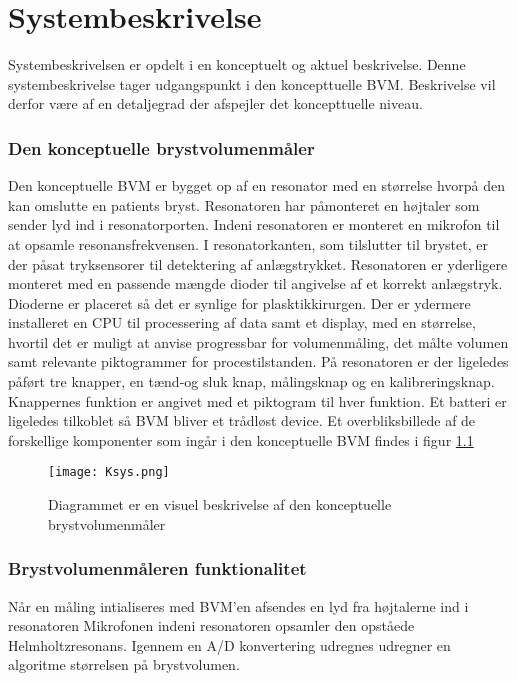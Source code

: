 \chapter{Systembeskrivelse}

Systembeskrivelsen er opdelt i en konceptuelt og aktuel beskrivelse.
Denne systembeskrivelse tager udgangspunkt i den koncepttuelle BVM. Beskrivelse vil derfor være af en detaljegrad der afspejler det koncepttuelle niveau.

		\subsection{Den konceptuelle brystvolumenmåler} \label{subsec:BVMopb}
		
		Den konceptuelle BVM er bygget op af en resonator med en størrelse hvorpå den kan omslutte en patients bryst. Resonatoren har påmonteret en højtaler som sender lyd ind i resonatorporten. Indeni resonatoren er monteret en mikrofon til at opsamle resonansfrekvensen. I resonatorkanten, som tilslutter til brystet, er der påsat tryksensorer til detektering af anlægstrykket. Resonatoren er yderligere monteret med en passende mængde dioder til angivelse af et korrekt anlægstryk. Dioderne er placeret så det er synlige for plasktikkirurgen. Der er ydermere installeret en CPU til processering af data samt et display, med en størrelse, hvortil det er muligt at anvise progressbar for volumenmåling, det målte volumen samt relevante piktogrammer for procestilstanden. På resonatoren er der ligeledes påført tre knapper, en tænd-og sluk knap, målingsknap og en kalibreringsknap. Knappernes funktion er angivet med et piktogram til hver funktion. Et batteri er ligeledes tilkoblet så BVM bliver et trådløst device.   Et overbliksbillede af de forskellige komponenter som ingår i den konceptuelle BVM findes i figur \ref{fig:ksys} 
		
		
\vspace{5mm}  
		
		\begin{figure}[htb]
			\centering
				\texttt{[image: Ksys.png]}
				\caption{Diagrammet er en visuel beskrivelse af den konceptuelle brystvolumenmåler}	
				\label{fig:ksys}
			\end{figure}	     
		
	
		\subsection{Brystvolumenmåleren funktionalitet}
		Når en måling intialiseres med BVM'en afsendes en lyd fra højtalerne ind i resonatoren  Mikrofonen indeni resonatoren opsamler den opståede Helmholtzresonans. Igennem en A/D konvertering udregnes  udregner en algoritme størrelsen på brystvolumen. 
	
